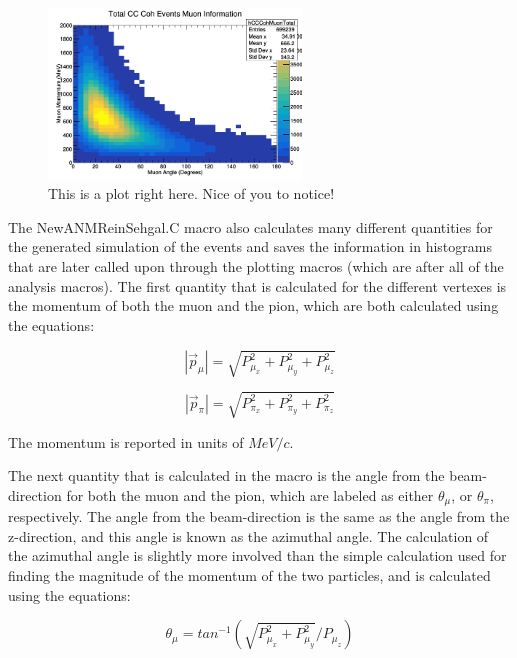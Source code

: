 \documentclass[11pt]{article}
\begin{document}
\begin{figure}[H]
\centering
\includegraphics[width=0.6\textwidth]{NewANMReinSehgalImages/9-TotalCCCohMuonInfoANMRS.png}
\caption{This is a plot right here. Nice of you to notice!}
\end{figure}

The NewANMReinSehgal.C macro also calculates many different quantities for the generated simulation of the events and saves the information in histograms that are later called upon through the plotting macros (which are after all of the analysis macros). The first quantity that is calculated for the different vertexes is the momentum of both the muon and the pion, which are both calculated using the equations:

\begin{equation}
|\vec{p}_\mu| = \sqrt{P_{\mu_x}^2 + P_{\mu_y}^2 + P_{\mu_z}^2}
\end{equation}

\begin{equation}
|\vec{p}_\pi| = \sqrt{P_{\pi_x}^2 + P_{\pi_y}^2 + P_{\pi_z}^2}
\end{equation}

\noindent
The momentum is reported in units of $MeV/c$.

The next quantity that is calculated in the macro is the angle from the beam-direction for both the muon and the pion, which are labeled as either $\theta_\mu$, or $\theta_\pi$, respectively. The angle from the beam-direction is the same as the angle from the z-direction, and this angle is known as the azimuthal angle. The calculation of the azimuthal angle is slightly more involved than the simple calculation used for finding the magnitude of the momentum of the two particles, and is calculated using the equations:

\begin{equation}
\theta_\mu = tan^{-1}(\sqrt{P_{\mu_x}^2 + P_{\mu_y}^2}/{P_{\mu_z}})
\end{equation}
\end{document}
